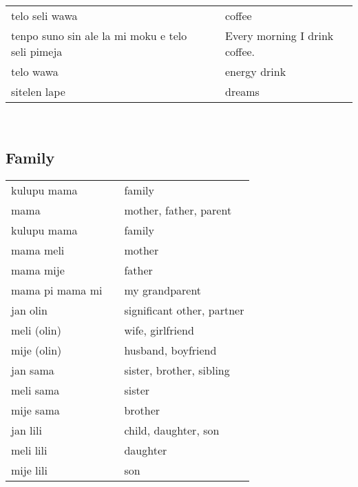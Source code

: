 \begin{supertabular}{p{4,5cm}|ll}
    telo seli wawa                                   &  & coffee                                                \\
    tenpo suno sin ale la mi moku e telo seli pimeja &  & Every morning I drink coffee.                         \\
    telo wawa                                        &  & energy drink                                          \\
    sitelen lape                                     &  & dreams                                                \\
\end{supertabular} \\

\subsection{Family}

\begin{supertabular}{p{4,5cm}|ll}
    kulupu mama     &  & family                     \\
    mama            &  & mother, father, parent     \\
    kulupu mama     &  & family                     \\
    mama meli       &  & mother                     \\
    mama mije       &  & father                     \\
    mama pi mama mi &  & my grandparent             \\
    jan olin        &  & significant other, partner \\
    meli (olin)     &  & wife, girlfriend           \\
    mije (olin)     &  & husband, boyfriend         \\
    jan sama        &  & sister, brother, sibling   \\
    meli sama       &  & sister                     \\
    mije sama       &  & brother                    \\
    jan lili        &  & child, daughter, son       \\
    meli lili       &  & daughter                   \\
    mije lili       &  & son                        \\
\end{supertabular} \\

